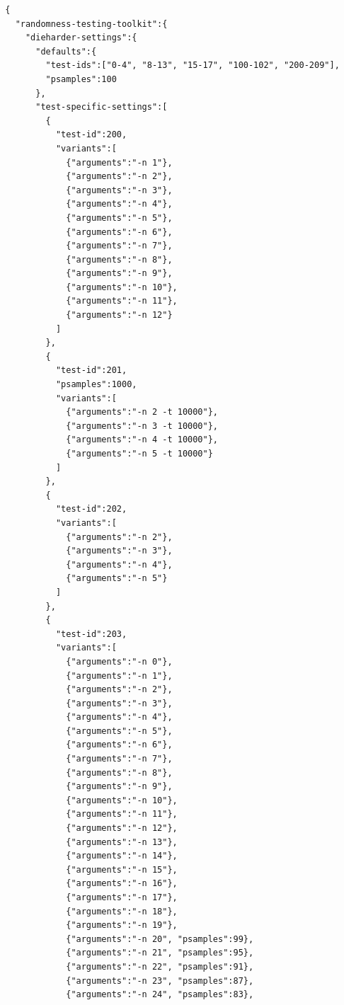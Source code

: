 \documentclass[
  digital,  	%
  color,		%
  oneside,   	%
  12pt,
  nocover,
  notable,
  nolof,
  nolot,
]{fithesis3}
\theoremstyle{definition}
\theoremstyle{remark}
\begin{document}
\begin{verbatim}
  {  
    "randomness-testing-toolkit":{  
      "dieharder-settings":{  
        "defaults":{  
          "test-ids":["0-4", "8-13", "15-17", "100-102", "200-209"],
          "psamples":100
        },
        "test-specific-settings":[  
          {  
            "test-id":200,
            "variants":[  
              {"arguments":"-n 1"},
              {"arguments":"-n 2"},
              {"arguments":"-n 3"},
              {"arguments":"-n 4"},
              {"arguments":"-n 5"},
              {"arguments":"-n 6"},
              {"arguments":"-n 7"},
              {"arguments":"-n 8"},
              {"arguments":"-n 9"},
              {"arguments":"-n 10"},
              {"arguments":"-n 11"},
              {"arguments":"-n 12"}
            ]
          },
          {  
            "test-id":201,
            "psamples":1000,
            "variants":[  
              {"arguments":"-n 2 -t 10000"},
              {"arguments":"-n 3 -t 10000"},
              {"arguments":"-n 4 -t 10000"},
              {"arguments":"-n 5 -t 10000"}
            ]
          },
          {  
            "test-id":202,
            "variants":[  
              {"arguments":"-n 2"},
              {"arguments":"-n 3"},
              {"arguments":"-n 4"},
              {"arguments":"-n 5"}
            ]
          },
          {  
            "test-id":203,
            "variants":[  
              {"arguments":"-n 0"},
              {"arguments":"-n 1"},
              {"arguments":"-n 2"},
              {"arguments":"-n 3"},
              {"arguments":"-n 4"},
              {"arguments":"-n 5"},
              {"arguments":"-n 6"},
              {"arguments":"-n 7"},
              {"arguments":"-n 8"},
              {"arguments":"-n 9"},
              {"arguments":"-n 10"},
              {"arguments":"-n 11"},
              {"arguments":"-n 12"},
              {"arguments":"-n 13"},
              {"arguments":"-n 14"},
              {"arguments":"-n 15"},
              {"arguments":"-n 16"},
              {"arguments":"-n 17"},
              {"arguments":"-n 18"},
              {"arguments":"-n 19"},
              {"arguments":"-n 20", "psamples":99},
              {"arguments":"-n 21", "psamples":95},
              {"arguments":"-n 22", "psamples":91},
              {"arguments":"-n 23", "psamples":87},
              {"arguments":"-n 24", "psamples":83},

\end{verbatim}
\end{document}
